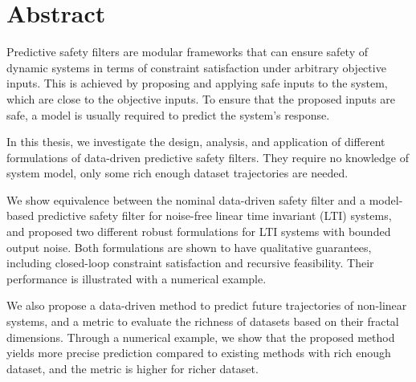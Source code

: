 




 \setcounter{tocdepth}{2}
 \tableofcontents

 \cleardoublepage


\chapter*{Abstract}

Predictive safety filters are modular frameworks that can ensure safety of dynamic systems in terms of constraint satisfaction under arbitrary objective inputs.
This is achieved by proposing and applying safe inputs to the system, which are close to the objective inputs.
To ensure that the proposed inputs are safe, a model is usually required to predict the system's response.

In this thesis, we investigate the design, analysis, and application of different formulations of data-driven predictive safety filters.
They require no knowledge of system model, only some rich enough dataset trajectories are needed.

We show equivalence between the nominal data-driven safety filter and a model-based predictive safety filter for noise-free linear time invariant (LTI) systems, and proposed two different robust formulations for LTI systems with bounded output noise.
Both formulations are shown to have qualitative guarantees, including closed-loop constraint satisfaction and recursive feasibility.
Their performance is illustrated with a numerical example.

We also propose a data-driven method to predict future trajectories of non-linear systems, and a metric to evaluate the richness of datasets based on their fractal dimensions.
Through a numerical example, we show that the proposed method yields more precise prediction compared to existing methods with rich enough dataset, and the metric is higher for richer dataset.

